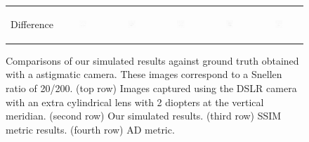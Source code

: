 \begin{figure}[!t]
\begin{tabular}{@{}r@{ } c@{ } c@{ } c@{ } c@{ } c }
	\begin{sideways} \parbox[b]{20mm} {Difference} \end{sideways} &
	\includegraphics[width=0.185\textwidth]{__Images/05/BW_20-200_+2@90/bw_N_20-200_Camera+2,00D@90(diff).png} &
	\includegraphics[width=0.185\textwidth]{__Images/05/BW_20-200_+2@90/bw_C_20-200_Camera+2,00D@90(diff).png} &
	\includegraphics[width=0.185\textwidth]{__Images/05/BW_20-200_+2@90/bw_K_20-200_Camera+2,00D@90(diff).png} &
	\includegraphics[width=0.185\textwidth]{__Images/05/BW_20-200_+2@90/bw_Z_20-200_Camera+2,00D@90(diff).png} &
	\includegraphics[width=0.185\textwidth]{__Images/05/BW_20-200_+2@90/bw_O_20-200_Camera+2,00D@90(diff).png} \\

	\end{tabular}
	
		\caption[Comparisons of our simulated results against ground truth obtained with a astigmatic camera]{Comparisons of our simulated results against ground truth obtained with a astigmatic camera. These images correspond to a Snellen ratio of 20/200. (top row) Images captured using the DSLR camera with an extra cylindrical lens with 2 diopters at the vertical meridian. (second row) Our simulated results. (third row) SSIM metric results. (fourth row) AD metric.}

	\label{fig:comparison_astig+2@90_bw}
\end{figure}
